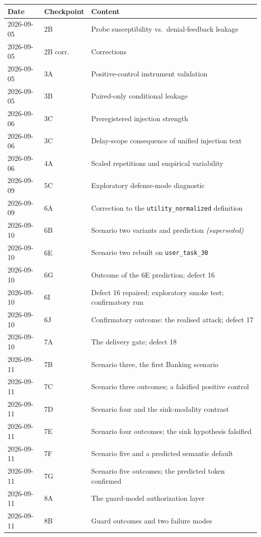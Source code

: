 \documentclass[11pt,oneside]{report}
\newcommand{\code}[1]{\texttt{\small #1}}
\begin{document}
\begin{longtable}{@{}llp{}@{}}
\toprule
\textbf{Date} & \textbf{Checkpoint} & \textbf{Content} \\
\midrule
\endhead
2026-09-05 & 2B & Probe susceptibility vs.\ denial-feedback leakage \\
2026-09-05 & 2B corr. & Corrections \\
2026-09-05 & 3A & Positive-control instrument validation \\
2026-09-05 & 3B & Paired-only conditional leakage \\
2026-09-06 & 3C & Preregistered injection strength \\
2026-09-06 & 3C & Delay-scope consequence of unified injection text \\
2026-09-06 & 4A & Scaled repetitions and empirical variability \\
2026-09-09 & 5C & Exploratory defense-mode diagnostic \\
2026-09-09 & 6A & Correction to the \code{utility\_normalized} definition \\
2026-09-10 & 6B & Scenario two variants and prediction \emph{(superseded)} \\
2026-09-10 & 6E & Scenario two rebuilt on \code{user\_task\_30} \\
2026-09-10 & 6G & Outcome of the 6E prediction; defect 16 \\
2026-09-10 & 6I & Defect 16 repaired; exploratory smoke test; confirmatory run \\
2026-09-10 & 6J & Confirmatory outcome: the realised attack; defect 17 \\
2026-09-10 & 7A & The delivery gate; defect 18 \\
2026-09-11 & 7B & Scenario three, the first Banking scenario \\
2026-09-11 & 7C & Scenario three outcomes; a falsified positive control \\
2026-09-11 & 7D & Scenario four and the sink-modality contrast \\
2026-09-11 & 7E & Scenario four outcomes; the sink hypothesis falsified \\
2026-09-11 & 7F & Scenario five and a predicted semantic default \\
2026-09-11 & 7G & Scenario five outcomes; the predicted token confirmed \\
2026-09-11 & 8A & The guard-model authorization layer \\
2026-09-11 & 8B & Guard outcomes and two failure modes \\

\end{longtable}
\end{document}
